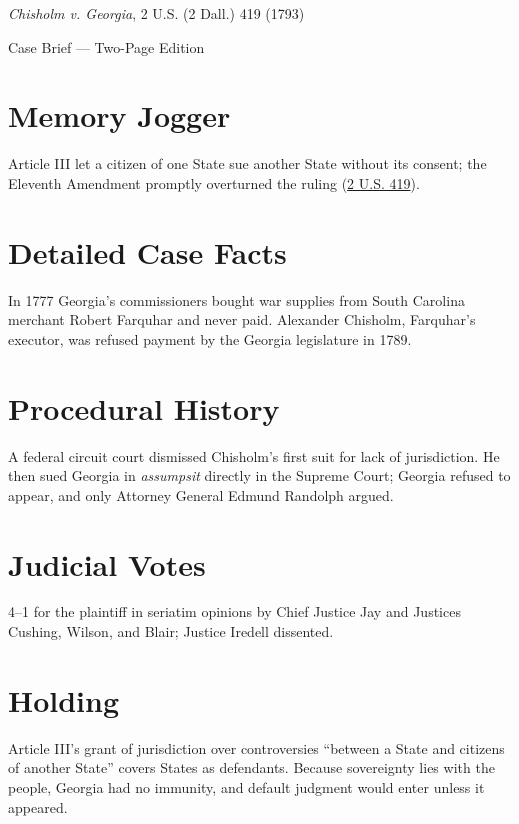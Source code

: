 \documentclass[12pt]{article}
\begin{document}
\begin{center}
{\LARGE \textit{Chisholm v. Georgia}, 2 U.S. (2 Dall.) 419 (1793)\par}
\vspace{0.5em}
{\large Case Brief --- Two-Page Edition\par}
\end{center}

\section{Memory Jogger}
Article III let a citizen of one State sue another State without its consent; the Eleventh Amendment promptly overturned the ruling (\href{https://supreme.justia.com/cases/federal/us/2/419/}{2 U.S. 419}).

\section{Detailed Case Facts}
In 1777 Georgia's commissioners bought war supplies from South Carolina merchant Robert Farquhar and never paid. Alexander Chisholm, Farquhar's executor, was refused payment by the Georgia legislature in 1789.

\section{Procedural History}
A federal circuit court dismissed Chisholm's first suit for lack of jurisdiction. He then sued Georgia in \emph{assumpsit} directly in the Supreme Court; Georgia refused to appear, and only Attorney General Edmund Randolph argued.

\section{Judicial Votes}
4--1 for the plaintiff in seriatim opinions by Chief Justice Jay and Justices Cushing, Wilson, and Blair; Justice Iredell dissented.

\section{Holding}
Article III's grant of jurisdiction over controversies ``between a State and citizens of another State'' covers States as defendants. Because sovereignty lies with the people, Georgia had no immunity, and default judgment would enter unless it appeared.
\end{document}
